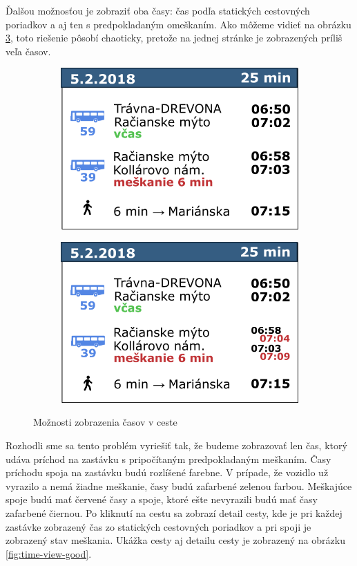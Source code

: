 Ďalšou možnosťou je zobraziť oba časy: čas podľa statických cestovných poriadkov a aj ten s predpokladaným omeškaním. Ako môžeme vidieť na obrázku \ref{fig:time-view-bad2}, toto riešenie pôsobí chaoticky, pretože na jednej stránke je zobrazených príliš veľa časov. 

\begin{figure}[H]
\centering
	\begin{subfigure}[b]{0.48\textwidth}
		\centering
 		\includegraphics[width=0.7\linewidth]{images/time-view1}
		\caption{ }
		\label{fig:time-view-bad1}
	\end{subfigure}
	\begin{subfigure}[b]{0.48\textwidth}
		\centering
		\includegraphics[width=0.7\linewidth]{images/time-view2}
			\caption{ }
		\label{fig:time-view-bad2}
	\end{subfigure}
	\caption[Možnosti zobrazenia časov v ceste]{Možnosti zobrazenia časov v ceste}
\end{figure}

Rozhodli sme sa tento problém vyriešiť tak, že budeme zobrazovať len čas, ktorý udáva príchod na zastávku s pripočítaným predpokladaným meškaním. Časy príchodu spoja na zastávku budú rozlíšené farebne. V prípade, že vozidlo už vyrazilo a nemá žiadne meškanie, časy budú zafarbené zelenou farbou. Meškajúce spoje budú mať červené časy a spoje, ktoré ešte nevyrazili budú mať časy zafarbené čiernou. 
Po kliknutí na cestu sa zobrazí detail cesty, kde je pri každej zastávke zobrazený čas zo statických cestovných  poriadkov a pri spoji je zobrazený stav meškania. Ukážka cesty aj detailu cesty je zobrazený na obrázku \ref{fig:time-view-good}.


